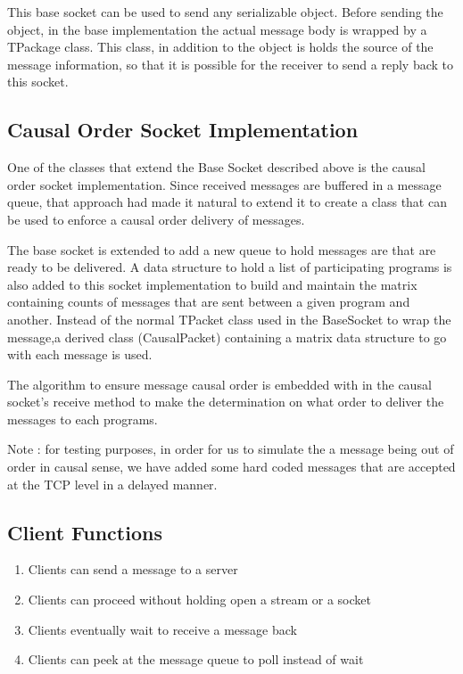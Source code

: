 \documentclass[twoside]{article}
\begin{document}
This base socket can be used to send any serializable object. Before sending the object, in the base implementation the actual message body is wrapped by a TPackage class. This class, in addition to the object is holds the source of the message information, so that it is possible for the receiver to send a reply back to this socket.

\subsection{Causal Order Socket Implementation}
One of the classes that extend the Base Socket described above is the causal order socket implementation. Since received messages are buffered in a message queue, that approach had made it natural to extend it to create a class that can be used to enforce a causal order delivery of messages.

The base socket is extended to add a new queue to hold messages are that are ready to be delivered. A data structure to hold a list of participating programs is also added to this socket implementation to build and maintain the matrix containing counts of messages that are sent between a given program and another. Instead of the normal TPacket class used in the BaseSocket to wrap the message,a derived class (CausalPacket) containing  a matrix data structure to go with each message is used.

The algorithm to ensure message causal order is embedded with in the causal socket's receive method to make the determination on what order to deliver the messages to each programs.

Note : for testing purposes, in order for us to simulate the a message being out of order in causal sense, we have added some hard coded messages that are accepted at the TCP level in a delayed manner.

\subsection{Client Functions}
\begin{enumerate}
    \item Clients can send a message to a server
    \item Clients can proceed without holding open a stream or a socket
    \item Clients eventually wait to receive a message back
    \item Clients can peek at the message queue to poll instead of wait
\end{enumerate}
\end{document}
